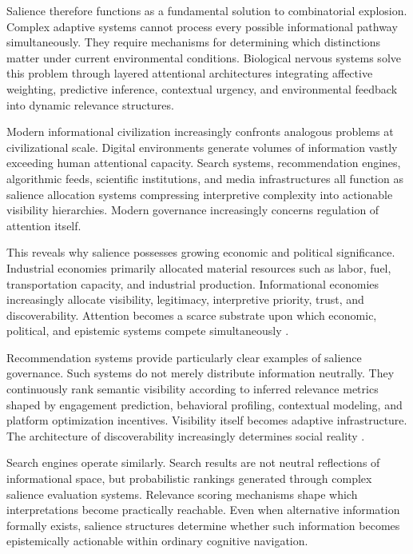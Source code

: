 \documentclass[11pt,a4paper]{article}
\begin{document}
Salience therefore functions as a fundamental solution to combinatorial explosion. Complex adaptive systems cannot process every possible informational pathway simultaneously. They require mechanisms for determining which distinctions matter under current environmental conditions. Biological nervous systems solve this problem through layered attentional architectures integrating affective weighting, predictive inference, contextual urgency, and environmental feedback into dynamic relevance structures.

Modern informational civilization increasingly confronts analogous problems at civilizational scale. Digital environments generate volumes of information vastly exceeding human attentional capacity. Search systems, recommendation engines, algorithmic feeds, scientific institutions, and media infrastructures all function as salience allocation systems compressing interpretive complexity into actionable visibility hierarchies. Modern governance increasingly concerns regulation of attention itself.

This reveals why salience possesses growing economic and political significance. Industrial economies primarily allocated material resources such as labor, fuel, transportation capacity, and industrial production. Informational economies increasingly allocate visibility, legitimacy, interpretive priority, trust, and discoverability. Attention becomes a scarce substrate upon which economic, political, and epistemic systems compete simultaneously \cite{zuboff2019}.

Recommendation systems provide particularly clear examples of salience governance. Such systems do not merely distribute information neutrally. They continuously rank semantic visibility according to inferred relevance metrics shaped by engagement prediction, behavioral profiling, contextual modeling, and platform optimization incentives. Visibility itself becomes adaptive infrastructure. The architecture of discoverability increasingly determines social reality \cite{gillespie2018}.

Search engines operate similarly. Search results are not neutral reflections of informational space, but probabilistic rankings generated through complex salience evaluation systems. Relevance scoring mechanisms shape which interpretations become practically reachable. Even when alternative information formally exists, salience structures determine whether such information becomes epistemically actionable within ordinary cognitive navigation.
\end{document}
